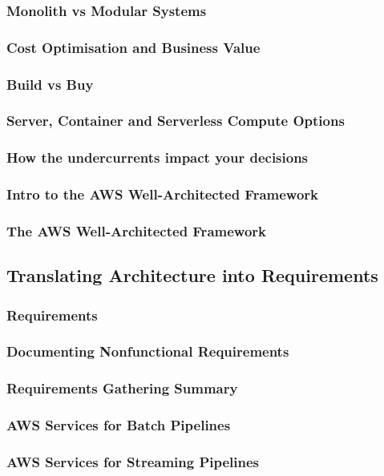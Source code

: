 \subsubsection{Monolith vs Modular Systems}
\subsubsection{Cost Optimisation and Business Value}
\subsubsection{Build vs Buy}
\subsubsection{Server, Container and Serverless Compute Options}
\subsubsection{How the undercurrents impact your decisions}
\subsubsection{Intro to the AWS Well-Architected Framework}
\subsubsection{The AWS Well-Architected Framework}

\subsection{Translating Architecture into Requirements}
\subsubsection{Requirements}
\subsubsection{Documenting Nonfunctional Requirements}
\subsubsection{Requirements Gathering Summary}
\subsubsection{AWS Services for Batch Pipelines}
\subsubsection{AWS Services for Streaming Pipelines}


